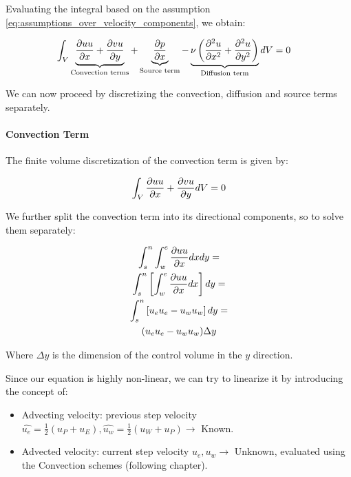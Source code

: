 Evaluating the integral based on the assumption \ref{eq:assumptions_over_velocity_components}, we obtain:

\begin{align}
    \int_{V} \underbrace{\frac{\partial u u}{\partial x} + \frac{\partial v u}{\partial y}}_{\text{Convection terms}} + \underbrace{\frac{\partial p}{\partial x}}_{\text{Source term}} - \underbrace{\nu \left( \frac{\partial^2 u}{\partial x^2} + \frac{\partial^2 u}{\partial y^2} \right)}_{\text{Diffusion term}} \space dV & = 0
    \label{eq:FVM_momentum_x_direction}
\end{align}

We can now proceed by discretizing the convection, diffusion and source terms separately.



%
%
\paragraph{Convection Term}

The finite volume discretization of the convection term is given by:

\begin{equation}
    \int_{V} \frac{\partial u u}{\partial x} + \frac{\partial v u}{\partial y} \space dV = 0
\end{equation}

We further split the convection term into its directional components, so to solve them separately:

\begin{gather}
    \int_{s}^{n} \int_{w}^{e} \frac{\partial u u}{\partial x} \space dxdy = \\
    \int_{s}^{n} \left[ \int_{w}^{e} \frac{\partial u u}{\partial x} \space dx \right] dy = \\
    \int_{s}^{n} \left[ u_e u_e - u_w u_w \right] dy = \\
    (u_e u_e - u_w u_w) \Delta y
\end{gather}

Where $\Delta y$ is the dimension of the control volume in the $y$ direction.

Since our equation is highly non-linear, we can try to linearize it by introducing the concept of:

\begin{itemize}
    \item Advecting velocity: previous step velocity $\hat{u_e} = \frac{1}{2} \left(u_P + u_E\right), \hat{u_w} = \frac{1}{2} \left(u_W + u_P\right) \rightarrow $ Known.
    \item Advected velocity: current step velocity $u_e, u_w\rightarrow $ Unknown, evaluated using the Convection schemes (following chapter).
\end{itemize}

